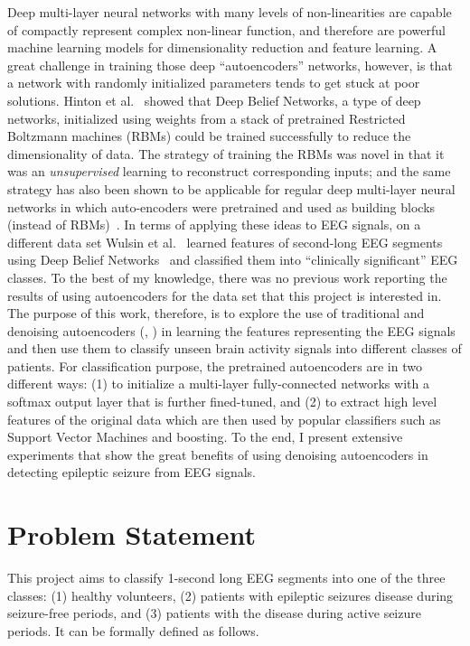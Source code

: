 \documentclass[12pt]{article}
\begin{document}
Deep multi-layer neural networks with many levels of non-linearities are capable of compactly represent complex non-linear function, and therefore are powerful machine learning models for dimensionality reduction and feature learning. A great challenge in training those deep ``autoencoders'' networks, however, is that a network with randomly initialized parameters tends to get stuck at poor solutions. Hinton et al.~\cite{hinton2006reducing} showed that Deep Belief Networks, a type of deep networks, initialized using weights from a stack of pretrained Restricted Boltzmann machines (RBMs) could be trained successfully to reduce the dimensionality of data. The strategy of training the RBMs was novel in that it was an \emph{unsupervised} learning to reconstruct corresponding inputs; and the same strategy has also been shown to be applicable for regular deep multi-layer neural networks in which auto-encoders were pretrained and used as building blocks (instead of RBMs)~\cite{bengio2007greedy}. In terms of applying these ideas to EEG signals, on a different data set Wulsin et al.~\cite{wulsin2011modeling} learned features of second-long EEG segments using Deep Belief Networks~\cite{hinton2006reducing} and classified them into ``clinically significant'' EEG classes. To the best of my knowledge, there was no previous work reporting the results of using autoencoders for the data set that this project is interested in. The purpose of this work, therefore, is to explore the use of traditional and denoising autoencoders (\cite{bengio2007greedy}, \cite{vincent2010stacked}) in learning the features representing the EEG signals and then use them to classify unseen brain activity signals into different classes of patients. For classification purpose, the pretrained autoencoders are in two different ways: (1) to initialize a multi-layer fully-connected networks with a softmax output layer that is further fined-tuned, and (2) to extract high level features of the original data which are then used by popular classifiers such as Support Vector Machines and boosting. To the end, I present extensive experiments that show the great benefits of using denoising autoencoders in detecting epileptic seizure from EEG signals.

\section{Problem Statement}
\noindent
This project aims to classify 1-second long EEG segments into one of the three classes: (1) healthy volunteers, (2) patients with epileptic seizures disease during seizure-free periods, and (3) patients with the disease during active seizure periods. It can be formally defined as follows.
\end{document}
